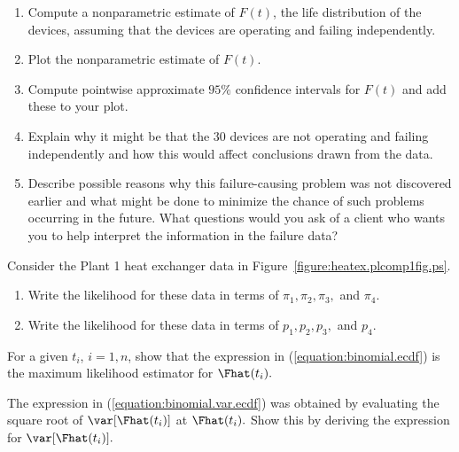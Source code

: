 \begin{exercise}
\begin{center}
{\begin{tabular}{rrrr}
\hline
\end{tabular}
}
\end{center}
\begin{enumerate}
\item
Compute a nonparametric estimate of  $F(t)$, the life
distribution of the devices, assuming that the devices are operating
and failing independently.
\item
Plot the nonparametric estimate of $F(t)$.
\item
Compute pointwise approximate $95\%$ confidence intervals for $F(t)$
and add these to your plot.
\item
Explain why it might be that the 30 devices are not operating and failing
independently and how this would affect conclusions drawn from the data.
\item
Describe possible reasons why this failure-causing problem was not
discovered earlier and what might be done to minimize the chance of
such problems occurring in the future. What questions would you ask of
a client who wants you to help interpret the information in the
failure data?
\end{enumerate}
\end{exercise}

\begin{exercise}
Consider the Plant 1 heat exchanger data in
Figure~\ref{figure:heatex.plcomp1fig.ps}.
\begin{enumerate}
\item
Write the likelihood for these data in terms of $\pi_{1}, \pi_{2},
\pi_{3},$ and $\pi_{4}.$
\item
Write the likelihood for these data in terms of $p_{1}, p_{2}, p_{3},$
and $p_{4}.$
\end{enumerate}
\end{exercise}

\begin{exercise1}
For a given $t_{i}$, $i=1,n$, show that the expression in
(\ref{equation:binomial.ecdf}) is the maximum likelihood estimator for
$\Fhat(t_{i}).$
\end{exercise1}

\begin{exercise1}
The expression in (\ref{equation:binomial.var.ecdf}) was obtained by
evaluating the square root of $\var[\Fhat (t_{i})]$ at
$\Fhat(t_{i}).$ Show this by deriving the expression for
$\var[\Fhat(t_{i})].$
\end{exercise1}

